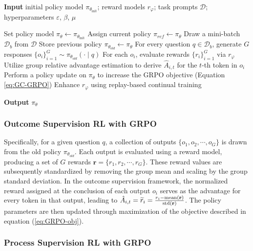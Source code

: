 \begin{itemize}[topsep=0pt]
\begin{itemize}[topsep=0pt]
\begin{algorithm}[t]
  \small
  \caption{Iterative Group Relative Policy Optimization}
  \textbf{Input} initial policy model $\pi_{\theta_{\text{init}}}$; reward models $r_\varphi$; task prompts $\mathcal{D}$; 
  hyperparameters $\varepsilon$, $\beta$, $\mu$
  \begin{algorithmic}[1]
    \State Set policy model $\pi_\theta \leftarrow \pi_{\theta_{\text{init}}}$
      \State Assign current policy $\pi_{ref} \leftarrow \pi_{\theta}$
        \State Draw a mini-batch $\mathcal{D}_b$ from $\mathcal{D}$
        \State Store previous policy $\pi_{\theta_{old}} \leftarrow \pi_{\theta}$
        \State For every question $q \in \mathcal{D}_b$, generate $G$ responses $\{o_i\}_{i=1}^G \sim \pi_{\theta_{old}} (\cdot \mid q)$
        \State For each $o_i$, evaluate rewards $\{r_i\}_{i=1}^G$ via $r_\varphi$
        \State Utilize group relative advantage estimation to derive $\hat{A}_{i,t}$ for the $t$-th token in $o_i$
          \State Perform a policy update on $\pi_\theta$ to increase the GRPO objective (Equation \ref{eq:GC-GRPO})
        \EndFor
      \EndFor 
      \State Enhance $r_\varphi$ using replay-based continual training
    \EndFor 
  \end{algorithmic}
  \textbf{Output} $\pi_\theta$
  \label{alg:iter-grpo}
\end{algorithm}

\subsubsection{Outcome Supervision RL with GRPO} Specifically, for a given question $q$, a collection of outputs $\{o_1, o_2, \cdots, o_G\}$ is drawn from the old policy $\pi_{\theta_{old}}$. Each output is evaluated using a reward model, producing a set of $G$ rewards $\mathbf{r} = \{r_1, r_2, \cdots, r_G\}$. These reward values are subsequently standardized by removing the group mean and scaling by the group standard deviation. In the outcome supervision framework, the normalized reward assigned at the conclusion of each output $o_i$ serves as the advantage for every token in that output, leading to $\hat{A}_{i, t} = \widetilde{r}_i = \frac{r_i- {\rm mean}(\mathbf{r})}{{\rm std}(\mathbf{r})}$. The policy parameters are then updated through maximization of the objective described in equation (\ref{eq:GRPO-obj}).

\subsubsection{Process Supervision RL with GRPO} 


\end{itemize}
\end{itemize}

